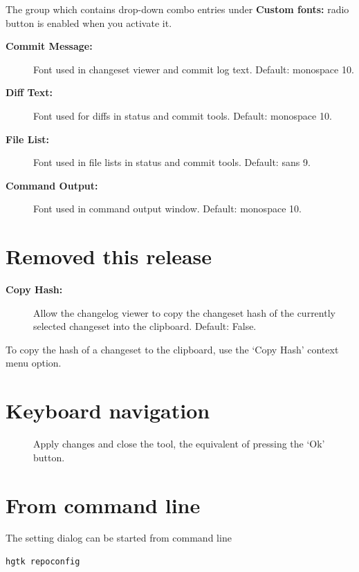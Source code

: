 \documentclass[letterpaper,10pt,english]{manual}
\begin{document}
The group which contains drop-down combo entries under
\textbf{Custom fonts:} radio button is enabled when you activate it.
\begin{description}
\item[\textbf{Commit Message:}]
Font used in changeset viewer and commit log text.
Default: monospace 10.

\item[\textbf{Diff Text:}]
Font used for diffs in status and commit tools.
Default: monospace 10.

\item[\textbf{File List:}]
Font used in file lists in status and commit tools.
Default: sans 9.

\item[\textbf{Command Output:}]
Font used in command output window.
Default: monospace 10.

\end{description}


\section{Removed this release}
\begin{description}
\item[\textbf{Copy Hash:}]
Allow the changelog viewer to copy the changeset hash
of the currently selected changeset into the clipboard.
Default: False.

\end{description}

To copy the hash of a changeset to the clipboard, use the `Copy Hash'
context menu option.


\section{Keyboard navigation}
\begin{description}
\item[]
Apply changes and close the tool, the equivalent of pressing the
`Ok' button.

\end{description}


\section{From command line}

The setting dialog can be started from command line

\begin{Verbatim}[commandchars=@\[\]]
hgtk repoconfig
\end{Verbatim}
\end{document}
